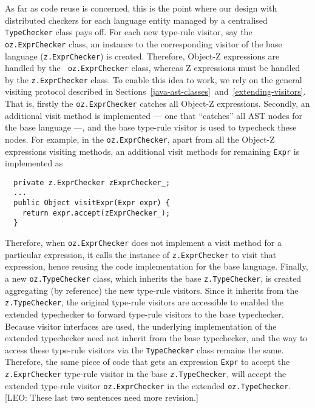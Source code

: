 \documentclass{llncs}
\begin{document}
As far as code reuse is concerned, this is the point where our design
with distributed checkers for each language entity managed by a
centralised {\tt TypeChecker} class pays off.  For each new type-rule
visitor, say the {\tt oz.ExprChecker} class, an instance to the
corresponding visitor of the base language ({\tt z.ExprChecker}) is
created. Therefore, Object-Z expressions are handled by the {\tt
oz.ExprChecker} class, whereas Z expressions must be handled by the
{\tt z.ExprChecker} class.  To enable this idea to work, we rely on
the general visiting protocol described in
Sections~\ref{java-ast-classes}~and~\ref{extending-visitors}.  That
is, firstly the {\tt oz.ExprChecker} catches all Object-Z expressions.
Secondly, an additional visit method is implemented --- one that
``catches'' all AST nodes for the base language ---, and the base
type-rule visitor is used to typecheck these nodes.  For example, in
the {\tt oz.ExprChecker}, apart from all the Object-Z expressions
visiting methods, an additional visit methods for remaining {\tt Expr}
is implemented as
%
\begin{verbatim}
  private z.ExprChecker zExprChecker_;
  ...
  public Object visitExpr(Expr expr) {
    return expr.accept(zExprChecker_);
  }
\end{verbatim}
%
Therefore, when {\tt oz.ExprChecker} does not implement a visit method for
a particular expression, it calls the instance of {\tt z.ExprChecker} to visit
that expression, hence reusing the code implementation for the base language.
Finally, a new {\tt oz.TypeChecker} class, which inherits the base {\tt z.TypeChecker},
is created aggregating (by reference) the new type-rule visitors.
Since it inherits from the {\tt z.TypeChecker}, the original type-rule visitors
are accessible to enabled the extended typechecker to forward type-rule visitors to the base typechecker.
Because visitor interfaces are used, the underlying implementation of the extended typechecker
need not inherit from the base typechecker, and the way to access these type-rule visitors via
the {\tt TypeChecker} class remains the same.
Therefore, the same piece of code that gets an expression {\tt Expr} to accept the {\tt z.ExprChecker}
type-rule visitor in the base {\tt z.TypeChecker}, will accept the extended type-rule visitor
{\tt oz.ExprChecker} in the extended {\tt oz.TypeChecker}.
[LEO: These last two sentences need more revision.]
\end{document}
